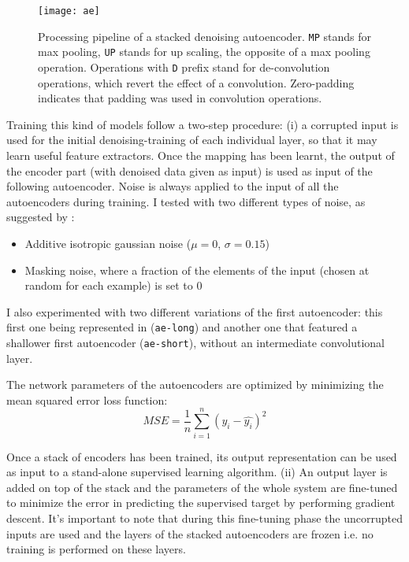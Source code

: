 \begin{figure*}[ht]
	\captionsetup{font=scriptsize, justification=centering}
    \centering
	\texttt{[image: ae]}
    \caption{Processing pipeline of a stacked denoising autoencoder. \texttt{MP} stands for max pooling, \texttt{UP} stands for up scaling, the opposite of a max pooling operation. Operations with \texttt{D} prefix stand for de-convolution operations, which revert the effect of a convolution. Zero-padding indicates that padding was used in convolution operations.}
    \label{fig:img_ae}
\end{figure*}

Training this kind of models follow a \mbox{two-step} procedure: (i) a corrupted input is used for the initial \mbox{denoising-training} of each individual layer, so that it may learn useful feature extractors. Once the mapping has been learnt, the output of the encoder part (with denoised data given as input) is used as input of the following autoencoder. Noise is always applied to the input of all the autoencoders during training. I tested with two different types of noise, as suggested by \cite{Pascal-2010}:

\begin{itemize}
\item Additive isotropic gaussian noise ($\mu = 0$, $\sigma=0.15$)
\item Masking noise, where a fraction of the elements of the input (chosen at random for each example) is set to 0
\end{itemize}

I also experimented with two different variations of the first autoencoder: this first one being represented in  (\texttt{ae-long}) and another one that featured a shallower first autoencoder (\texttt{ae-short}), without an intermediate convolutional layer.

The network parameters of the autoencoders are optimized by minimizing the mean squared error loss function:
$$MSE = \frac{1}{n} \sum_{i=1}^{n}(y_i - \hat{y_i})^2$$

Once a stack of encoders has been trained, its output representation can be used as input to a \mbox{stand-alone} supervised learning algorithm. (ii) An output layer is added on top of the stack and the parameters of the whole system are \mbox{fine-tuned} to minimize the error in predicting the supervised target by performing gradient descent. It's important to note that during this \mbox{fine-tuning} phase the uncorrupted inputs are used and the layers of the stacked autoencoders are frozen i.e. no training is performed on these layers.
